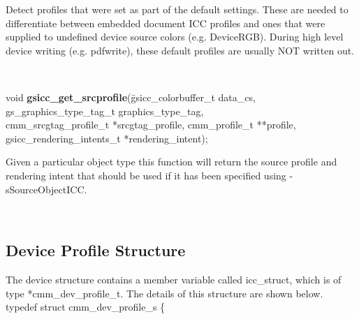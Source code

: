 \documentclass[12pt,notitlepage]{article}
\begin{document}
\begin{minipage}[h]{6.0in}
Detect profiles that were set as part of the default settings.  These are needed to differentiate between embedded document ICC profiles and ones that were supplied to undefined device source colors (e.g. DeviceRGB).  During high level device writing (e.g. pdfwrite), these default profiles are usually NOT written out.
\end{minipage}\\

\begin{tabbing}
\noindent void {\bf gsicc\_get\_srcprofile}(\=gsicc\_colorbuffer\_t data\_cs,\\
                     \>gs\_graphics\_type\_tag\_t graphics\_type\_tag,\\
                     \>cmm\_srcgtag\_profile\_t *srcgtag\_profile,
                     cmm\_profile\_t **profile,\\
                     \>gsicc\_rendering\_intents\_t *rendering\_intent);\\
\end{tabbing}

\begin{minipage}[h]{6.0in}
Given a particular object type this function will return the source profile and rendering intent that should be used
if it has been specified using -sSourceObjectICC.
\end{minipage}\\

\singlespace

\subsection{Device Profile Structure}

The device structure contains a member variable called icc\_struct, which is of type *cmm\_dev\_profile\_t.  The details
of this structure are shown below.\\

\noindent typedef struct cmm\_dev\_profile\_s \{
\end{document}
